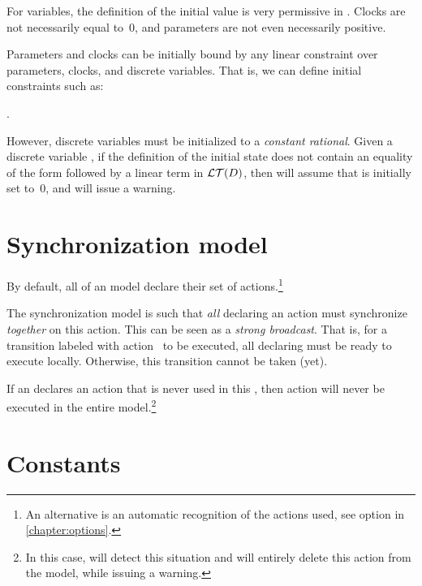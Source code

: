 For variables, the definition of the initial value is very permissive in \imitator{}.
Clocks are not necessarily equal to~0, and parameters are not even necessarily positive.

Parameters and clocks can be initially bound by any linear constraint over parameters, clocks, and discrete variables.
That is, we can define initial constraints such as:
\begin{center}
	.
\end{center}

However, discrete variables must be initialized to a \emph{constant rational}.
Given a discrete variable , if the definition of the initial state does not contain an equality of the form  followed by a linear term in $\mathcal{LT}(D)$, then \imitator{} will assume that  is initially set to~0, and will issue a warning.



\section{Synchronization model}\label{sect:synchronization}

By default, all \IPTA{} of an \imitator{} model declare their set of actions.\footnote{%
	An alternative is an automatic recognition of the actions used, see option  in \cref{chapter:options}.
}

The \imitator{} synchronization model is such that \emph{all} \IPTA{} declaring an action must synchronize \emph{together} on this action.
This can be seen as a \emph{strong broadcast}.
That is, for a transition labeled with action~ to be executed, all \IPTA{} declaring  must be ready to execute  locally.
Otherwise, this transition cannot be taken (yet).

If an \IPTA{} declares an action  that is never used in this \IPTA{}, then action  will never be executed in the entire model.\footnote{%
	In this case, \imitator{} will detect this situation and will entirely delete this action from the model, while issuing a warning.
}

\section{Constants}

